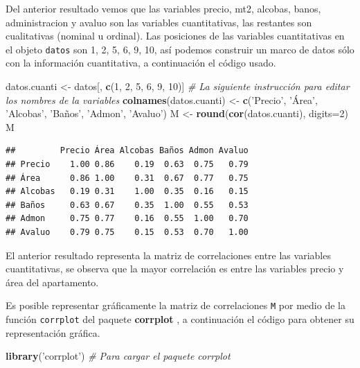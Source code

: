 \documentclass[10pt,]{krantz}
\makeatletter
\newenvironment{Shaded}{\begin{snugshade}}{\end{snugshade}}
\newcommand{\KeywordTok}[1]{\textcolor[rgb]{0.13,0.29,0.53}{\textbf{#1}}}
\newcommand{\DataTypeTok}[1]{\textcolor[rgb]{0.13,0.29,0.53}{#1}}
\newcommand{\DecValTok}[1]{\textcolor[rgb]{0.00,0.00,0.81}{#1}}
\newcommand{\StringTok}[1]{\textcolor[rgb]{0.31,0.60,0.02}{#1}}
\newcommand{\CommentTok}[1]{\textcolor[rgb]{0.56,0.35,0.01}{\textit{#1}}}
\newcommand{\NormalTok}[1]{#1}
\newenvironment{kframe}{%
\medskip{}
\setlength{\fboxsep}{.8em}
 \def\at@end@of@kframe{}%
 \ifinner\ifhmode%
  \def\at@end@of@kframe{\end{minipage}}%
  \begin{minipage}{\columnwidth}%
 \fi\fi%
 \def\FrameCommand##1{\hskip\@totalleftmargin \hskip-\fboxsep
 \colorbox{shadecolor}{##1}\hskip-\fboxsep
     \hskip-\linewidth \hskip-\@totalleftmargin \hskip\columnwidth}%
 \MakeFramed {\advance\hsize-\width
   \@totalleftmargin\z@ \linewidth\hsize
   \@setminipage}}%
 {\par\unskip\endMakeFramed%
 \at@end@of@kframe}
\renewenvironment{Shaded}{\begin{kframe}}{\end{kframe}}
\makeatother
\begin{document}
Del anterior resultado vemos que las variables precio, mt2, alcobas,
banos, administracion y avaluo son las variables cuantitativas, las
restantes son cualitativas (nominal u ordinal). Las posiciones de las
variables cuantitativas en el objeto \texttt{datos} son 1, 2, 5, 6, 9,
10, así podemos construir un marco de datos sólo con la información
cuantitativa, a continuación el código usado.

\begin{Shaded}
\begin{Highlighting}[]
\NormalTok{datos.cuanti <-}\StringTok{ }\NormalTok{datos[, }\KeywordTok{c}\NormalTok{(}\DecValTok{1}\NormalTok{, }\DecValTok{2}\NormalTok{, }\DecValTok{5}\NormalTok{, }\DecValTok{6}\NormalTok{, }\DecValTok{9}\NormalTok{, }\DecValTok{10}\NormalTok{)]}
\CommentTok{# La siguiente instrucción para editar los nombres de la variables}
\KeywordTok{colnames}\NormalTok{(datos.cuanti) <-}\StringTok{ }\KeywordTok{c}\NormalTok{(}\StringTok{'Precio'}\NormalTok{, }\StringTok{'Área'}\NormalTok{, }\StringTok{'Alcobas'}\NormalTok{,}
                            \StringTok{'Baños'}\NormalTok{, }\StringTok{'Admon'}\NormalTok{, }\StringTok{'Avaluo'}\NormalTok{)}
\NormalTok{M <-}\StringTok{ }\KeywordTok{round}\NormalTok{(}\KeywordTok{cor}\NormalTok{(datos.cuanti), }\DataTypeTok{digits=}\DecValTok{2}\NormalTok{)}
\NormalTok{M}
\end{Highlighting}
\end{Shaded}

\begin{verbatim}
##         Precio Área Alcobas Baños Admon Avaluo
## Precio    1.00 0.86    0.19  0.63  0.75   0.79
## Área      0.86 1.00    0.31  0.67  0.77   0.75
## Alcobas   0.19 0.31    1.00  0.35  0.16   0.15
## Baños     0.63 0.67    0.35  1.00  0.55   0.53
## Admon     0.75 0.77    0.16  0.55  1.00   0.70
## Avaluo    0.79 0.75    0.15  0.53  0.70   1.00
\end{verbatim}

El anterior resultado representa la matriz de correlaciones entre las
variables cuantitativas, se observa que la mayor correlación es entre
las variables precio y área del apartamento.

Es posible representar gráficamente la matriz de correlaciones
\texttt{M} por medio de la función \texttt{corrplot} del paquete
\textbf{corrplot} \citep{R-corrplot}, a continuación el
código para obtener su representación gráfica.

\begin{Shaded}
\begin{Highlighting}[]
\KeywordTok{library}\NormalTok{(}\StringTok{'corrplot'}\NormalTok{)  }\CommentTok{# Para cargar el paquete corrplot}
\end{Highlighting}
\end{Shaded}
\end{document}
